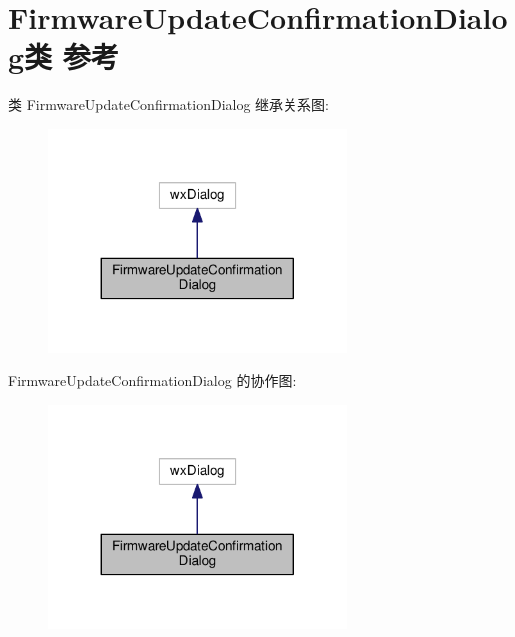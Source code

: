 \hypertarget{class_firmware_update_confirmation_dialog}{\section{Firmware\+Update\+Confirmation\+Dialog类 参考}
\label{class_firmware_update_confirmation_dialog}
}


类 Firmware\+Update\+Confirmation\+Dialog 继承关系图\+:
\nopagebreak
\begin{figure}[H]
\begin{center}
\leavevmode
\includegraphics[width=224pt]{class_firmware_update_confirmation_dialog__inherit__graph}
\end{center}
\end{figure}


Firmware\+Update\+Confirmation\+Dialog 的协作图\+:
\nopagebreak
\begin{figure}[H]
\begin{center}
\leavevmode
\includegraphics[width=224pt]{class_firmware_update_confirmation_dialog__coll__graph}
\end{center}
\end{figure}
